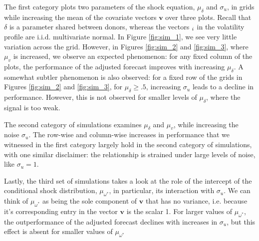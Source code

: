 \documentclass[11pt,3p,review,authoryear]{elsarticle}
\newcommand{\x}{\textbf{v}}
\def\mbi#1{\boldsymbol{#1}} %
\def\v#1{\mbi{#1}} %
\theoremstyle{definition}
\begin{document}
The first category plots two parameters of the shock equation, $\mu_{\delta}$ and $\sigma_{u}$, in grids while increasing the mean of the covariate vectors $\x$ over three plots.  Recall that $\delta$ is a parameter shared between donors, whereas the vectors $\v_{i}$ in the volatility profile are i.i.d. multivariate normal.  In Figure \ref{fig:sim_1}, we see very little variation across the grid.  However, in Figures \ref{fig:sim_2} and \ref{fig:sim_3}, where $\mu_{v}$ is increased, we observe an expected phenomenon: for any fixed column of the plots, the performance of the adjusted forecast improves with increasing $\mu_{\delta}$.  A somewhat subtler phenomenon is also observed: for a fixed row of the grids in Figures \ref{fig:sim_2} and \ref{fig:sim_3}, for $\mu_{\delta} \geq .5$, increasing $\sigma_{u}$ leads to a decline in performance.  However, this is not observed for smaller levels of $\mu_{\delta}$, where the signal is too weak.

The second category of simulations examines $\mu_{\delta}$ and $\mu_{v}$, while increasing the noise $\sigma_{u}$.  The row-wise and column-wise increases in performance that we witnessed in the first category largely hold in the second category of simulations, with one similar disclaimer: the relationship is strained under large levels of noise, like $\sigma_{u} = 1$.


Lastly, the third set of simulations takes a look at the role of the intercept of the conditional shock distribution, $\mu_{\omega^{*}}$, in particular, its interaction with $\sigma_{u}$.  We can think of $\mu_{\omega^{*}}$ as being the sole component of $\x$ that has no variance, i.e. because it's corresponding entry in the vector $\x$ is the scalar 1.  For larger values of $\mu_{\omega^{*}}$, the outperformance of the adjusted forecast declines with increases in $\sigma_{u}$, but this effect is absent for smaller values of $\mu_{\omega^{*}}$ 
\end{document}
